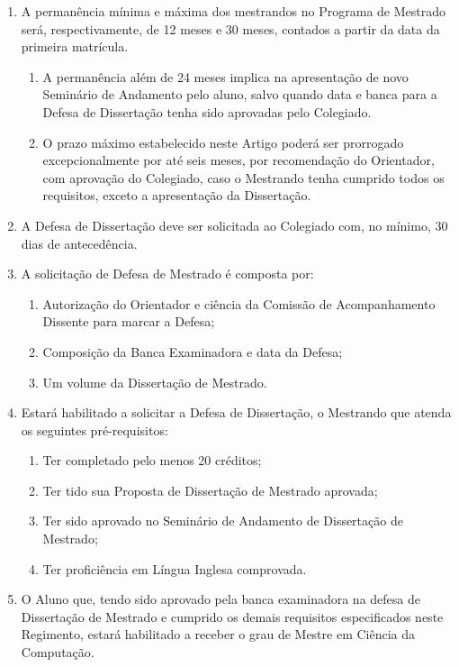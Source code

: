 \documentclass{article}
\newcommand{\grupoMenor}{Colegiado\xspace}
\begin{document}
\begin{enumerate}
	\item A permanência mínima e máxima dos mestrandos no Programa de Mestrado será, respectivamente, de 12 meses e 30 meses, contados a partir da data da primeira matrícula.
	\begin{enumerate}
		\item A permanência além de 24 meses implica na apresentação de novo Seminário de Andamento pelo aluno, salvo quando data e banca para a Defesa de Dissertação tenha sido aprovadas pelo \grupoMenor.	
		\item O prazo máximo estabelecido neste Artigo poderá ser prorrogado excepcionalmente por até seis meses, por recomendação do Orientador, com aprovação do \grupoMenor, caso o Mestrando tenha cumprido todos os requisitos, exceto a apresentação da Dissertação.
	\end{enumerate}

	\item A Defesa de Dissertação deve ser solicitada ao \grupoMenor com, no mínimo, 30 dias de antecedência. 
	\item A solicitação de Defesa de Mestrado é composta por:
    \begin{enumerate}[label=\Roman*]
        \item Autorização do Orientador e ciência da Comissão de Acompanhamento Dissente para marcar a Defesa;
        \item Composição da Banca Examinadora e data da Defesa;
        \item Um volume da Dissertação de Mestrado.
    \end{enumerate}
	\item Estará habilitado a solicitar a Defesa de Dissertação, o Mestrando que atenda os seguintes pré-requisitos:
	\begin{enumerate}[label=\Roman*]
		\item 	Ter completado pelo menos 20 créditos;
		\item 	Ter tido sua Proposta de Dissertação de Mestrado aprovada;
		\item 	Ter sido aprovado no Seminário de Andamento de Dissertação de Mestrado;
		\item 	Ter proficiência em Língua Inglesa comprovada.
	\end{enumerate}

	\item O Aluno que, tendo sido aprovado pela banca examinadora na defesa de Dissertação de Mestrado e cumprido os demais requisitos especificados neste Regimento, estará habilitado a receber o grau de Mestre em Ciência da Computação.

\end{enumerate}
\end{document}
